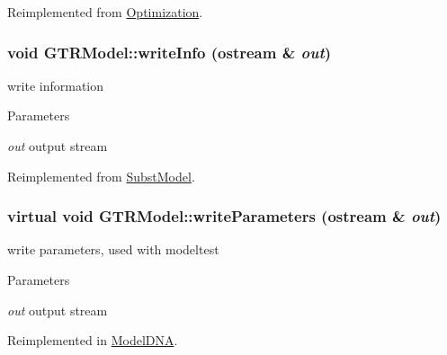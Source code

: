 Reimplemented from \hyperlink{classOptimization_a7fe7c6178977ef7840ff65d216bf590e}{Optimization}.\hypertarget{classGTRModel_a233f9b473e4e3c549d801ff8a084e35e}{
\subsubsection[{writeInfo}]{\setlength{\rightskip}{0pt plus 5cm}void GTRModel::writeInfo (ostream \& {\em out})}}
\label{classGTRModel_a233f9b473e4e3c549d801ff8a084e35e}
write information 
\begin{DoxyParams}{Parameters}
\item[{\em out}]output stream \end{DoxyParams}


Reimplemented from \hyperlink{classSubstModel_ac81144591a9eb6b6d9abc9e873a20af6}{SubstModel}.\hypertarget{classGTRModel_a3dd6bc6cb405e76346eac7b813687a20}{
\subsubsection[{writeParameters}]{\setlength{\rightskip}{0pt plus 5cm}virtual void GTRModel::writeParameters (ostream \& {\em out})}}
\label{classGTRModel_a3dd6bc6cb405e76346eac7b813687a20}
write parameters, used with modeltest 
\begin{DoxyParams}{Parameters}
\item[{\em out}]output stream \end{DoxyParams}


Reimplemented in \hyperlink{classModelDNA_a46a8fd333239a3937e6116608e20cc78}{ModelDNA}.

